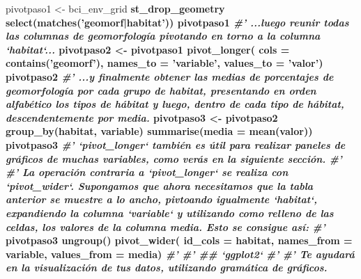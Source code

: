 \documentclass[11pt,]{article}
\newenvironment{Shaded}{\begin{snugshade}}{\end{snugshade}}
\newcommand{\KeywordTok}[1]{\textcolor[rgb]{0.13,0.29,0.53}{\textbf{#1}}}
\newcommand{\DataTypeTok}[1]{\textcolor[rgb]{0.13,0.29,0.53}{#1}}
\newcommand{\StringTok}[1]{\textcolor[rgb]{0.31,0.60,0.02}{#1}}
\newcommand{\CommentTok}[1]{\textcolor[rgb]{0.56,0.35,0.01}{\textit{#1}}}
\newcommand{\OtherTok}[1]{\textcolor[rgb]{0.56,0.35,0.01}{#1}}
\newcommand{\OperatorTok}[1]{\textcolor[rgb]{0.81,0.36,0.00}{\textbf{#1}}}
\newcommand{\NormalTok}[1]{#1}
\begin{document}
\begin{Shaded}
\begin{Highlighting}[]
{{{{{{{{{{{{{{{{{{{{{{{{{{{{{{{{{{{{{{{{{{{{{{{{{{{{{{{{{{{{{{{{{{{{{{{{{{\NormalTok{pivotpaso1 <-}\StringTok{ }\NormalTok{bci_env_grid }\OperatorTok{%
\StringTok{  }\NormalTok{st_drop_geometry }\OperatorTok{%
\StringTok{  }\KeywordTok{select}\NormalTok{(}\KeywordTok{matches}\NormalTok{(}\StringTok{'geomorf|habitat'}\NormalTok{))}
\NormalTok{pivotpaso1 }\OperatorTok{%
\CommentTok{#' ...luego reunir todas las columnas de geomorfología pivotando en torno a la columna `habitat`...}
\NormalTok{pivotpaso2 <-}\StringTok{ }\NormalTok{pivotpaso1 }\OperatorTok{%
\StringTok{  }\KeywordTok{pivot_longer}\NormalTok{(}
    \DataTypeTok{cols =} \KeywordTok{contains}\NormalTok{(}\StringTok{'geomorf'}\NormalTok{),}
    \DataTypeTok{names_to =} \StringTok{'variable'}\NormalTok{,}
    \DataTypeTok{values_to =} \StringTok{'valor'}\NormalTok{)}
\NormalTok{pivotpaso2 }\OperatorTok{%
\CommentTok{#' ...y finalmente obtener las medias de porcentajes de geomorfología por cada grupo de habitat, presentando en orden alfabético los tipos de hábitat y luego, dentro de cada tipo de hábitat, descendentemente por media.}
\NormalTok{pivotpaso3 <-}\StringTok{ }\NormalTok{pivotpaso2 }\OperatorTok{%
\StringTok{  }\KeywordTok{group_by}\NormalTok{(habitat, variable) }\OperatorTok{%
\StringTok{  }\KeywordTok{summarise}\NormalTok{(}\DataTypeTok{media =} \KeywordTok{mean}\NormalTok{(valor))}
\NormalTok{pivotpaso3 }\OperatorTok{%
\CommentTok{#' `pivot_longer` también es útil para realizar paneles de gráficos de muchas variables, como verás en la siguiente sección.}
\CommentTok{#' }
\CommentTok{#' La operación contraria a `pivot_longer` se realiza con `pivot_wider`. Supongamos que ahora necesitamos que la tabla anterior se muestre a lo ancho, pivtoando igualmente `habitat`, expandiendo la columna `variable` y utilizando como relleno de las celdas, los valores de la columna media. Esto se consigue así:}
\CommentTok{#' }
\NormalTok{pivotpaso3 }\OperatorTok{%
\StringTok{  }\KeywordTok{ungroup}\NormalTok{() }\OperatorTok{%
\StringTok{  }\KeywordTok{pivot_wider}\NormalTok{(}
    \DataTypeTok{id_cols =}\NormalTok{ habitat,}
    \DataTypeTok{names_from =}\NormalTok{ variable,}
    \DataTypeTok{values_from =}\NormalTok{ media)}
\CommentTok{#' }
\CommentTok{#' ## `ggplot2`}
\CommentTok{#' }
\CommentTok{#' Te ayudará en la visualización de tus datos, utilizando gramática de gráficos.}
}}}}}}}}}}}}}}}}}}}}}}}}}}}}}}}}}}}}}}}}}}}}}}}}}}}}}}}}}}}}}}}}}}}}}}}}}}}}}}}}}}}}
\end{Highlighting}
\end{Shaded}
\end{document}
